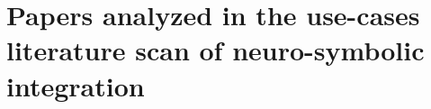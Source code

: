 \chapter{Papers analyzed in the use-cases literature scan of neuro-symbolic integration}
\begingroup
\renewcommand{\chapter}[2]{}
\endgroup